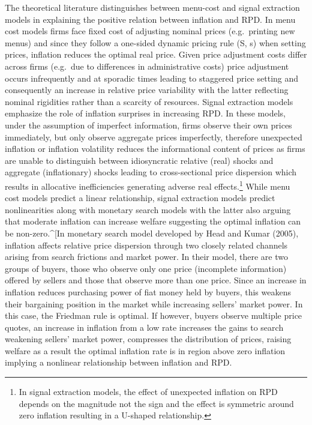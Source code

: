 \documentclass[
  letterpaper,
  DIV=11,
  numbers=noendperiod]{scrartcl}
\begin{document}
The theoretical literature distinguishes between menu-cost and signal
extraction models in explaining the positive relation between inflation
and RPD. In menu cost models
\citep{sheshinki1979, sheshinski1983, rotemberg1983, benabou1992} firms
face fixed cost of adjusting nominal prices (e.g.~printing new menus)
and since they follow a one-sided dynamic pricing rule (S, s) when
setting prices, inflation reduces the optimal real price. Given price
adjustment costs differ across firms (e.g.~due to differences in
administrative costs) price adjustment occurs infrequently and at
sporadic times leading to staggered price setting and consequently an
increase in relative price variability with the latter reflecting
nominal rigidities rather than a scarcity of resources. Signal
extraction models emphasize the role of inflation surprises in
increasing RPD. In these models, under the assumption of imperfect
information, firms observe their own prices immediately, but only
observe aggregate prices imperfectly, therefore unexpected inflation or
inflation volatility reduces the informational content of prices as
firms are unable to distinguish between idiosyncratic relative (real)
shocks and aggregate (inflationary) shocks
\citep{lucas1973, hercowitz1981, cukierman1983, barro1976} leading to
cross-sectional price dispersion which results in allocative
inefficiencies generating adverse real effects.\footnote{In signal
  extraction models, the effect of unexpected inflation on RPD depends
  on the magnitude not the sign and the effect is symmetric around zero
  inflation resulting in a U-shaped relationship.} While menu cost
models predict a linear relationship, signal extraction models predict
nonlinearities along with monetary search models \citep{head2005} with
the latter also arguing that moderate inflation can increase welfare
suggesting the optimal inflation can be non-zero.\^{}{[}In monetary
search model developed by Head and Kumar (2005), inflation affects
relative price dispersion through two closely related channels arising
from search frictions and market power. In their model, there are two
groups of buyers, those who observe only one price (incomplete
information) offered by sellers and those that observe more than one
price. Since an increase in inflation reduces purchasing power of fiat
money held by buyers, this weakens their bargaining position in the
market while increasing sellers' market power. In this case, the
Friedman rule is optimal. If however, buyers observe multiple price
quotes, an increase in inflation from a low rate increases the gains to
search weakening sellers' market power, compresses the distribution of
prices, raising welfare as a result the optimal inflation rate is in
region above zero inflation implying a nonlinear relationship between
inflation and RPD.
\end{document}
